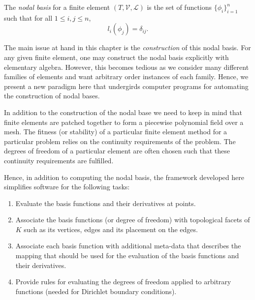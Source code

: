 

\begin{definition}
The \emph{nodal basis} for a finite element \( (T,\mathcal{V},\mathcal{L}) \) 
is the set of functions \( \{ \phi_i \}_{i=1}^{n} \) such
that for all \( 1 \leq i,j \leq n \),
\begin{equation}
l_i(\phi_j) = \delta_{ij}.
\end{equation}
\label{chap:kirby-1:nodaldef}
\end{definition}

The main issue at hand in this chapter is the \emph{construction} of
this nodal basis.  For
any given finite element, one may construct the nodal basis
explicitly with elementary algebra.  However, this becomes tedious as
we consider many different families of elements and want arbitrary
order instances of each family.  Hence, we present a new 
paradigm here that undergirds computer programs for automating the
construction of nodal bases.

In addition to the construction of the nodal base we need to keep in mind that
finite elements are patched together to form a piecewise
polynomial field over a mesh. The fitness (or stability) of a particular finite element method for a particular problem relies on the continuity
requirements of the problem. The degrees of freedom of a particular element
are often chosen such that these continuity requirements are fulfilled.

Hence, in addition to computing the nodal basis, the framework developed here
simplifies software for the following tasks:

\begin{enumerate}
\item Evaluate the basis functions and their derivatives at points.
\item Associate the basis functions (or degree of freedom) with
      topological facets of \( K \) such as its vertices, edges and its
      placement on the edges.
\item Associate each basis function with additional meta-data that describes  
      the mapping that should be used for the evaluation of the basis functions and their derivatives.
\item Provide rules for evaluating the degrees of freedom applied to arbitrary functions 
      (needed for Dirichlet boundary conditions).
\end{enumerate}



